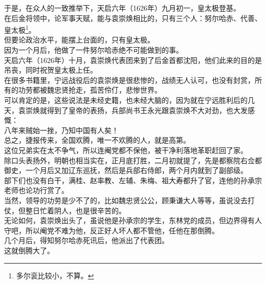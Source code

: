 \begin{multicols}{\theparacolNo}
于是，在众人的一致推举下，天启六年（1626年）九月初一，皇太极登基。\\

在后金将领中，论军事天赋，能与袁崇焕相比的，只有三个人：努尔哈赤、代善、皇太极\footnote{多尔衮比较小，不算。}。\\

但要论政治水平，能摆上台面的，只有皇太极。\\

因为一个月后，他做了一件努尔哈赤绝不可能做到的事。\\

天启六年（1626年）十月，袁崇焕代表团来到了后金首都沈阳，他们此来的目的是吊丧，同时祝贺皇太极上任。\\

在很多书籍里，宁远战役后的袁崇焕是很悲惨的，战绩无人认可，也没有封赏，所有的功劳都被魏忠贤抢走，孤苦伶仃，悲惨世界。\\

可以肯定的是，这些说法是未经史籍，也未经大脑的，因为就在宁远胜利后的几天，袁崇焕就得到了皇帝的表扬，兵部尚书王永光跟袁崇焕不大对劲，也大发感慨：\\

八年来贼始一挫，乃知中国有人矣！\\

总之，捷报传来，全国欢腾，唯一不欢腾的人，就是高第。\\

这位兄弟实在太不争气，所以连阉党都不保他，被干净利落地革职赶回了家。\\

除口头表扬外，明朝也相当实在，正月底打胜，二月初就提了，先是都察院右佥都御史，一个月后又加辽东巡抚，然后是兵部右侍郎，两个月内就到了副部级。\\

部下们也没有白干，满桂、赵率教、左辅、朱梅、祖大寿都升了官，连他的孙承宗老师也论功行赏了。\\

当然，领导的功劳是少不了的，比如魏忠贤公公，顾秉谦大人等等，虽说没去打仗，但整日忙着阴人，也是很辛苦的。\\

无论如何，袁崇焕出头了，虽说他是孙承宗的学生，东林党的成员，但边界得有人守吧，所以阉党不难为他，反正好人坏人都不管他，任他在那倒腾。\\

几个月后，得知努尔哈赤死讯后，他派出了代表团。\\

这就倒腾大了。\\


\end{multicols}
